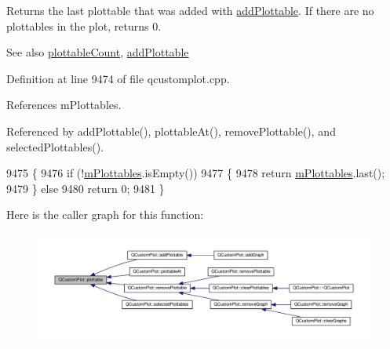 Returns the last plottable that was added with \hyperlink{class_q_custom_plot_ab7ad9174f701f9c6f64e378df77927a6}{add\+Plottable}. If there are no plottables in the plot, returns 0.

\begin{DoxySeeAlso}{See also}
\hyperlink{class_q_custom_plot_a2dbfbf15dc38713f9a1c445a3dd2e989}{plottable\+Count}, \hyperlink{class_q_custom_plot_ab7ad9174f701f9c6f64e378df77927a6}{add\+Plottable} 
\end{DoxySeeAlso}


Definition at line 9474 of file qcustomplot.\+cpp.



References m\+Plottables.



Referenced by add\+Plottable(), plottable\+At(), remove\+Plottable(), and selected\+Plottables().


\begin{DoxyCode}
9475 \{
9476   \textcolor{keywordflow}{if} (!\hyperlink{class_q_custom_plot_a62bf8e4e7f8d23fc1e9301ba0148269f}{mPlottables}.isEmpty())
9477   \{
9478     \textcolor{keywordflow}{return} \hyperlink{class_q_custom_plot_a62bf8e4e7f8d23fc1e9301ba0148269f}{mPlottables}.last();
9479   \} \textcolor{keywordflow}{else}
9480     \textcolor{keywordflow}{return} 0;
9481 \}
\end{DoxyCode}


Here is the caller graph for this function\+:\nopagebreak
\begin{figure}[H]
\begin{center}
\leavevmode
\includegraphics[width=350pt]{class_q_custom_plot_adea38bdc660da9412ba69fb939031567_icgraph}
\end{center}
\end{figure}


\hypertarget{class_q_custom_plot_ac1d1bc6ae4e13616fb02cef6d9e2188e}{}
